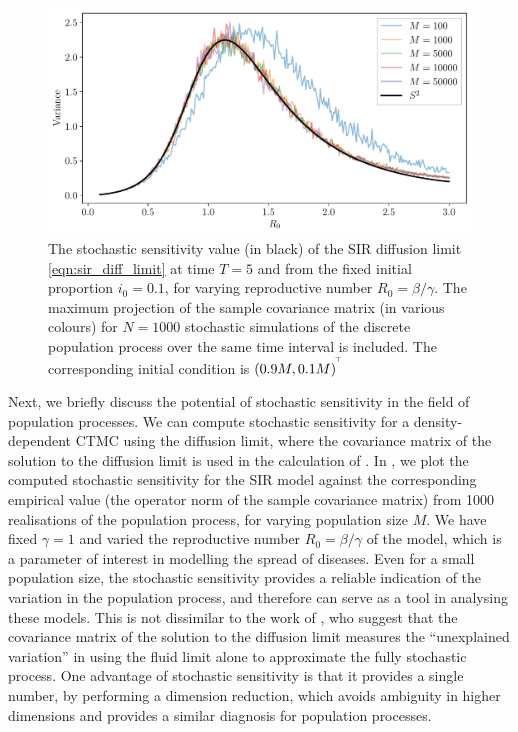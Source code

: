\begin{figure}
	\begin{center}
		\includegraphics[width=\textwidth]{chp06_applications/figures/sir/sir_s2_R0}
		\caption{The stochastic sensitivity value (in black) of the SIR diffusion limit \cref{eqn:sir_diff_limit} at time \(T = 5\) and from the fixed initial proportion \(i_0 = 0.1\), for varying reproductive number \(R_0 = \beta / \gamma\).
			The maximum projection of the sample covariance matrix (in various colours) for \(N = 1000\) stochastic simulations of the discrete population process over the same time interval is included.
			The corresponding initial condition is \(\left(0.9M, 0.1M\right)^{^{\!\top}}\)}
		\label{fig:sir_s2}
	\end{center}
\end{figure}

Next, we briefly discuss the potential of stochastic sensitivity in the field of population processes.
We can compute stochastic sensitivity for a density-dependent CTMC using the diffusion limit, where the covariance matrix of the solution to the diffusion limit is used in the calculation of .
In , we plot the computed stochastic sensitivity for the SIR model against the corresponding empirical value (the operator norm of the sample covariance matrix) from 1000 realisations of the population process, for varying population size \(M\).
We have fixed \(\gamma = 1\) and varied the reproductive number \(R_0 = \beta/\gamma\) of the model, which is a parameter of interest in modelling the spread of diseases.
Even for a small population size, the stochastic sensitivity provides a reliable indication of the variation in the population process, and therefore can serve as a tool in analysing these models.
This is not dissimilar to the work of \citet{PollettEtAl_2010_ModellingPopulationProcesses}, who suggest that the covariance matrix of the solution to the diffusion limit measures the ``unexplained variation'' in using the fluid limit alone to approximate the fully stochastic process.
One advantage of stochastic sensitivity is that it provides a single number, by performing a dimension reduction, which avoids ambiguity in higher dimensions and provides a similar diagnosis for population processes.



